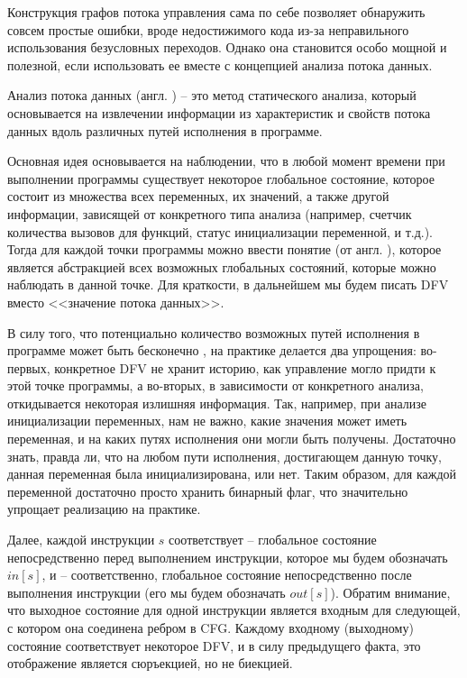 Конструкция графов потока управления сама по себе позволяет обнаружить совсем простые ошибки, вроде недостижимого кода из-за неправильного использования безусловных переходов. Однако она становится особо мощной и полезной, если использовать ее вместе с концепцией анализа потока данных.

\begin{definition}
	Анализ потока данных (англ. )  -- это метод статического анализа, который основывается на извлечении информации из характеристик и свойств потока данных вдоль различных путей исполнения в программе.
\end{definition}

Основная идея основывается на наблюдении, что в любой момент времени при выполнении программы существует некоторое глобальное состояние, которое состоит из множества всех переменных, их значений, а также другой информации, зависящей от конкретного типа анализа (например, счетчик количества вызовов для функций, статус инициализации переменной, и т.д.). Тогда для каждой точки программы можно ввести понятие  (от англ. ), которое является абстракцией всех возможных глобальных состояний, которые можно наблюдать в данной точке. Для краткости, в дальнейшем мы будем писать DFV вместо <<значение потока данных>>.

В силу того, что потенциально количество возможных путей исполнения в программе может быть бесконечно \cite{dragon-book}, на практике делается два упрощения: во-первых, конкретное DFV не хранит историю, как управление могло придти к этой точке программы, а во-вторых, в зависимости от конкретного анализа, откидывается некоторая излишняя информация. Так, например, при анализе инициализации переменных, нам не важно, какие значения может иметь переменная, и на каких путях исполнения они могли быть получены. Достаточно знать, правда ли, что на любом пути исполнения, достигающем данную точку, данная переменная была инициализирована, или нет. Таким образом, для каждой переменной достаточно просто хранить бинарный флаг, что значительно упрощает реализацию на практике.

Далее, каждой инструкции $s$ соответствует  -- глобальное состояние непосредственно перед выполнением инструкции, которое мы будем обозначать $in[s]$, и  -- соответственно, глобальное состояние непосредственно после выполнения инструкции (его мы будем обозначать $out[s]$). Обратим внимание, что выходное состояние для одной инструкции является входным для следующей, с котором она соединена ребром в CFG. Каждому входному (выходному) состояние соответствует некоторое DFV, и в силу предыдущего факта, это отображение является сюръекцией, но не биекцией.

